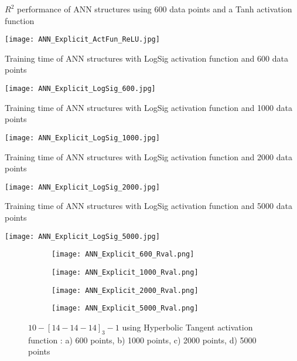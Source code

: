\begin{table}
	\caption{$R^2$ performance of ANN structures using 600 data points and a Tanh activation function}
	\label{ReLU_table}
	\texttt{[image: ANN\_Explicit\_ActFun\_ReLU.jpg]}
\end{table}

\begin{table}
	\caption{Training time of ANN structures with LogSig activation function and 600 data points}
	\label{ANN_Explicit_LogSig_600_table}
	\texttt{[image: ANN\_Explicit\_LogSig\_600.jpg]}
\end{table}

\begin{table}
	\caption{Training time of ANN structures with LogSig activation function and 1000 data points}
	\label{ANN_Explicit_LogSig_1000_table}
	\texttt{[image: ANN\_Explicit\_LogSig\_1000.jpg]}
\end{table}

\begin{table}
	\caption{Training time of ANN structures with LogSig activation function and 2000 data points}
	\label{ANN_Explicit_LogSig_2000_table}
	\texttt{[image: ANN\_Explicit\_LogSig\_2000.jpg]}
\end{table}

\begin{table}
	\caption{Training time of ANN structures with LogSig activation function and 5000 data points}
	\label{ANN_Explicit_LogSig_5000_table}
	\texttt{[image: ANN\_Explicit\_LogSig\_5000.jpg]}
\end{table}

\begin{figure}
	\centering
	\begin{subfigure}[b]{0.49\textwidth}
		\centering
		\texttt{[image: ANN\_Explicit\_600\_Rval.png]}
		\caption{}
		\label{600_Rval}
	\end{subfigure}
	\hfill
	\begin{subfigure}[b]{0.49\textwidth}
		\centering
		\texttt{[image: ANN\_Explicit\_1000\_Rval.png]}
		\caption{}
		\label{1000_Rval}
	\end{subfigure}
	\hfill
	\begin{subfigure}[b]{0.49\textwidth}
		\centering
		\texttt{[image: ANN\_Explicit\_2000\_Rval.png]}
		\caption{}
		\label{2000_Rval}
	\end{subfigure}
	\hfill
	\begin{subfigure}[b]{0.49\textwidth}
		\centering
		\texttt{[image: ANN\_Explicit\_5000\_Rval.png]}
		\caption{}
		\label{5000_Rval}
	\end{subfigure}
	\caption{$10-[14-14-14]_3-1$ using Hyperbolic Tangent activation function : a) 600 points, b) 1000 points, c) 2000 points, d) 5000 points}
	\label{$R^2$ performance of ANN structure}
\end{figure}







